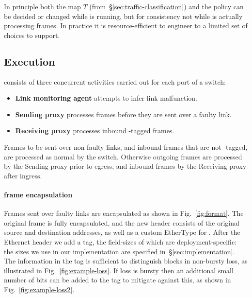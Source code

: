 In principle both the map $T$ (from~\S\ref{sec:traffic-classification}) and
the policy can be decided or changed while \OurSys is running, but for
consistency not while \OurSys is actually processing frames. In practice it is
resource-efficient to engineer to a limited set of choices to support.


\subsection{Execution}
\OurSys consists of three concurrent activities carried out for each port of a
switch:
\begin{itemize}
  \item \textbf{Link monitoring agent} attempts to infer link malfunction.
  \item \textbf{Sending proxy} processes frames before they are sent over a faulty link.
  \item \textbf{Receiving proxy} processes inbound \OurSys-tagged frames.
\end{itemize}

Frames to be sent over non-faulty links, and inbound frames that are not
\OurSys-tagged, are processed as normal by the switch. Otherwise outgoing frames
are processed by the Sending proxy prior to egress, and inbound frames by
the Receiving proxy after ingress.

\paragraph{\OurSys frame encapsulation}
Frames sent over faulty links are encapsulated as shown in Fig.~\ref{fig:format}.
The original frame is fully encapsulated, and the new header consists of the original source and destination addresses, as well as a custom EtherType for \OurSys.
After the Ethernet header we add a \OurSys tag, the field-sizes of which
are deployment-specific: the sizes we use in our implementation are specified
in~\S\ref{sec:implementation}.
The information in the \OurSys tag is sufficient to distinguish blocks in
non-bursty loss, as illustrated in Fig.~\ref{fig:example-loss}. If loss is
bursty then an additional small number of bits can be added to the tag to
mitigate against this, as shown in Fig.~\ref{fig:example-loss2}.

